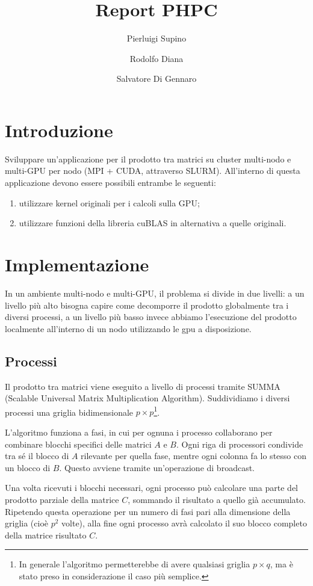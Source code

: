 \documentclass[a4paper]{article}
\title{Report PHPC}
\author{Pierluigi Supino \and Rodolfo Diana \and Salvatore Di Gennaro}
\begin{document}
\maketitle
\tableofcontents

\section{Introduzione}

Sviluppare un’applicazione per il prodotto tra matrici su cluster multi-nodo e multi-GPU per nodo (MPI + CUDA, attraverso SLURM). All’interno di questa applicazione devono essere possibili entrambe le seguenti:
\begin{enumerate}
    \item utilizzare kernel originali per i calcoli sulla GPU;
    \item utilizzare funzioni della libreria cuBLAS in alternativa a quelle originali.
\end{enumerate}

\section{Implementazione}

In un ambiente multi-nodo e multi-GPU, il problema si divide in due livelli: a un livello più alto bisogna capire come decomporre il prodotto globalmente tra i diversi processi, a un livello più basso invece abbiamo l'esecuzione del prodotto localmente all'interno di un nodo utilizzando le gpu a disposizione.

\subsection{Processi}
Il prodotto tra matrici viene eseguito a livello di processi tramite SUMMA (Scalable Universal Matrix Multiplication Algorithm)\cite{SUMMA}.
Suddividiamo i diversi processi una griglia bidimensionale $p \times p$\footnote{In generale l'algoritmo permetterebbe di avere qualsiasi griglia $p \times q$, ma è stato preso in considerazione il caso più semplice.}.

L'algoritmo funziona a fasi, in cui per ognuna i processo collaborano per combinare blocchi specifici delle matrici $A$ e $B$. Ogni riga di processori condivide tra sé il blocco di $A$ rilevante per quella fase, mentre ogni colonna fa lo stesso con un blocco di $B$. Questo avviene tramite un’operazione di broadcast.

Una volta ricevuti i blocchi necessari, ogni processo può calcolare una parte del prodotto parziale della matrice $C$, sommando il risultato a quello già accumulato. Ripetendo questa operazione per un numero di fasi pari alla dimensione della griglia (cioè $p^2$ volte), alla fine ogni processo avrà calcolato il suo blocco completo della matrice risultato $C$.
\end{document}
